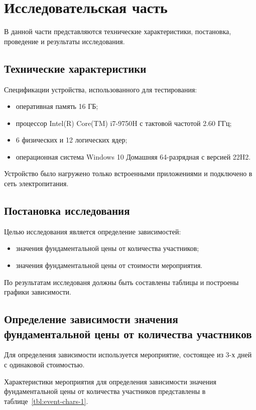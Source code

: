 \chapter{Исследовательская часть}

В данной части представляются технические характеристики, постановка, проведение и результаты исследования.

\section{Технические характеристики}

Спецификации устройства, использованного для тестирования:
\begin{itemize}[label=--]
	\item оперативная память 16 ГБ;
	\item процессор Intel(R) Core(TM) i7-9750H с тактовой частотой 2.60 ГГц;
	\item 6 физических и 12 логических ядер;
	\item операционная система Windows 10 Домашняя 64-разрядная с версией 22H2.
\end{itemize}

Устройство было нагружено только встроенными приложениями и подключено в сеть электропитания. 

\section{Постановка исследования}

Целью исследования является определение зависимостей:
\begin{itemize}[label=--]
	\item значения фундаментальной цены от количества участников;
	\item значения фундаментальной цены от стоимости мероприятия.
\end{itemize}

По результатам исследованя должны быть составлены таблицы и построены графики зависимости.

\section{Определение зависимости значения фундаментальной цены от количества участников}

Для определения зависимости используется мероприятие, состоящее из 3-х дней с одинаковой стоимостью.

Характеристики мероприятия для определения зависимости значения фундаментальной цены от количества участников представлены в таблице~\ref{tbl:event-chars-1}.

